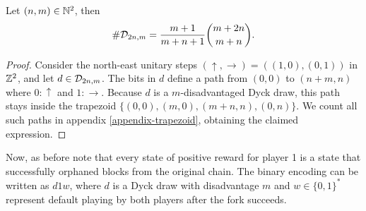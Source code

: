 \begin{myprop*}
	\label{prop-trapezoidcardinality}
	Let $(n,m)\in \mathbb{N}^2$, then 
	$$\#\mathcal{D}_{2n,m}=\frac{m+1}{m+n+1}{m+2n\choose m+n}.$$
\end{myprop*}
\begin{proof}
Consider the north-east unitary steps $(\uparrow,\rightarrow)=((1,0),(0,1))$ in $\mathbb{Z}^2$, and let $d\in \mathcal{D}_{2n,m}$. The bits in $d$ define a path from $(0,0)$ to $(n+m,n)$ where $0:\uparrow$ and $1:\rightarrow$. Because $d$ is a $m$-disadvantaged Dyck draw, this path stays inside the trapezoid $\{(0,0),(m,0),(m+n,n),(0,n)\}$. We count all such paths in appendix \ref{appendix-trapezoid}, obtaining the claimed expression.
\end{proof}
Now, as before note that every state of positive reward for player 1 is a state that successfully orphaned blocks from the original chain. The binary encoding can be written as $d1w$, where $d$ is a Dyck draw with disadvantage $m$ and $w\in\{0,1\}^\ast$ represent default playing by both players after the fork succeeds. 


